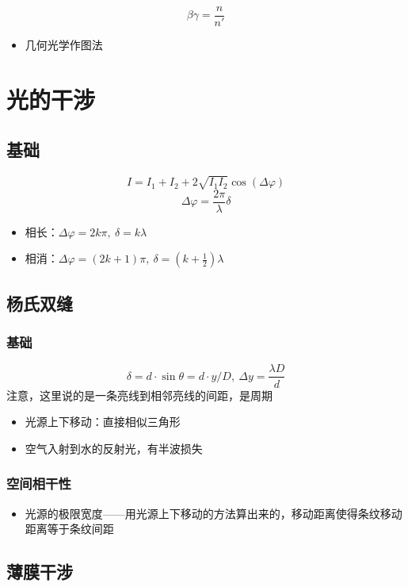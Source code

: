 \documentclass{article}
\begin{document}
$$
\beta\gamma=\frac{n}{n'}
$$

\begin{itemize}
    \item 几何光学作图法
\end{itemize}

\section{光的干涉}

\subsection{基础}

$$
I=I_1+I_2+2\sqrt{I_1I_2}\cos(\Delta\varphi)
$$ $$
\Delta\varphi=\frac{2\pi}{\lambda}\delta
$$ \begin{itemize}
    \item 相长：$\Delta\varphi=2k\pi,\ \delta=k\lambda$
    \item 相消：$\Delta\varphi=(2k+1)\pi,\ \delta=(k+\frac{1}{2})\lambda$
\end{itemize}

\subsection{杨氏双缝}

\subsubsection{基础}

$$
\delta=d\cdot\sin\theta=d\cdot y/D,\ \Delta y=\frac{\lambda D}{d}
$$
注意，这里说的是一条亮线到相邻亮线的间距，是周期 \begin{itemize}
    \item 光源上下移动：直接相似三角形
    \item 空气入射到水的反射光，有半波损失
\end{itemize}

\subsubsection{空间相干性}

\begin{itemize}
    \item 光源的极限宽度——用光源上下移动的方法算出来的，移动距离使得条纹移动距离等于条纹间距
\end{itemize}

\subsection{薄膜干涉}
\end{document}
